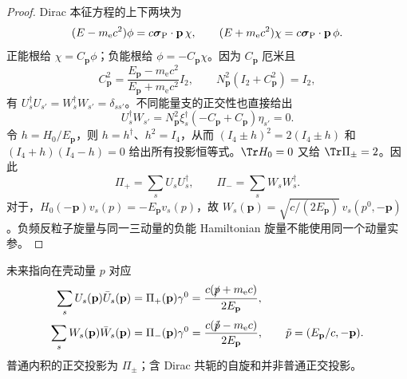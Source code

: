 \begin{proof}
Dirac 本征方程的上下两块为
\begin{equation*}
 (E-m_{\mathrm e}c^2)\phi=c\boldsymbol\sigma_{\rm P}\cdot\mathbf p\,\chi,
 \qquad
 (E+m_{\mathrm e}c^2)\chi=c\boldsymbol\sigma_{\rm P}\cdot\mathbf p\,\phi.
\end{equation*}
正能根给 $\chi=C_{\mathbf p}\phi$；负能根给 $\phi=-C_{\mathbf p}\chi$。因为 $C_{\mathbf p}$ 厄米且
\begin{equation*}
 C_{\mathbf p}^2=
 \frac{E_{\mathbf p}-m_{\mathrm e}c^2}{E_{\mathbf p}+m_{\mathrm e}c^2}I_2,
 \qquad N_{\mathbf p}^2(I_2+C_{\mathbf p}^2)=I_2,
\end{equation*}
有 $U_s^\dagger U_{s'}=W_s^\dagger W_{s'}=\delta_{ss'}$。不同能量支的正交性也直接给出
\begin{equation*}
 U_s^\dagger W_{s'}=N_{\mathbf p}^2\xi_s^\dagger(-C_{\mathbf p}+C_{\mathbf p})\eta_{s'}=0.
\end{equation*}
令 $h=H_0/E_{\mathbf p}$，则 $h=h^\dagger$、$h^2=I_4$，从而 $(I_4\pm h)^2=2(I_4\pm h)$ 和 $(I_4+h)(I_4-h)=0$ 给出所有投影恒等式。$\Tr H_0=0$ 又给 $\Tr\Pi_\pm=2$。因此
\begin{equation*}
 \Pi_+=\sum_sU_sU_s^\dagger,
 \qquad \Pi_-=\sum_sW_sW_s^\dagger.
\end{equation*}
对于，$H_0(-\mathbf p)v_s(p)=-E_{\mathbf p}v_s(p)$，故 $W_s(\mathbf p)=\sqrt{c/(2E_{\mathbf p})}\,v_s(p^0,-\mathbf p)$。负频反粒子旋量与同一三动量的负能 Hamiltonian 旋量不能使用同一个动量实参。
\end{proof}

\begin{proposition}[协变自旋和与概率投影的换算]
未来指向在壳动量 $p$ 对应
\begin{align}
 \sum_sU_s(\mathbf p)\bar U_s(\mathbf p)
 &=\Pi_+(\mathbf p)\gamma^0
 =\frac{c(\slashed p+m_{\mathrm e}c)}{2E_{\mathbf p}},
 \label{eq:feqo-probability-spin-sum}\\
 \sum_sW_s(\mathbf p)\bar W_s(\mathbf p)
 &=\Pi_-(\mathbf p)\gamma^0
 =\frac{c(\slashed{\tilde p}-m_{\mathrm e}c)}{2E_{\mathbf p}},
 \qquad \tilde p=(E_{\mathbf p}/c,-\mathbf p).
 \label{eq:feqo-negative-probability-spin-sum}
\end{align}
普通内积的正交投影为 $\Pi_\pm$；含 Dirac 共轭的自旋和并非普通正交投影。
\end{proposition}

